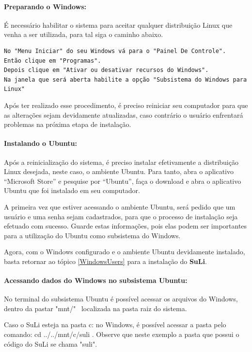 \documentclass[12pt, a4paper]{article}
\newcommand{\SL}{{\bf SuLi}}
\begin{document}
\paragraph{Preparando o Windows:} É necessário habilitar o sistema para aceitar qualquer distribuição Linux que venha a ser utilizada, para tal siga o caminho abaixo.

\begin{verbatim}
No "Menu Iniciar" do seu Windows vá para o "Painel De Controle".
Então clique em "Programas".
Depois clique em "Ativar ou desativar recursos do Windows".
Na janela que será aberta habilite a opção "Subsistema do Windows para Linux"
\end{verbatim}
Após ter realizado esse procedimento, é preciso reiniciar seu computador para que as alterações sejam devidamente atualizadas, caso contrário o usuário enfrentará problemas na próxima etapa de instalação.



\paragraph{Instalando o Ubuntu:} Após a reinicialização do sistema, é preciso instalar efetivamente a distribuição Linux desejada, neste caso, o ambiente Ubuntu. Para tanto, abra o aplicativo ``Microsoft Store'' e pesquise por ``Ubuntu'', faça o download e abra o aplicativo Ubuntu que foi instalado em seu computador.

A primeira vez que estiver acessando o ambiente Ubuntu, será pedido que um usuário e uma senha sejam cadastrados, para que o processo de instalação seja efetuado com sucesso. Guarde estas informações, pois elas podem ser importantes para a utilização do Ubuntu como subsistema do Windows.

Agora, com o Windows configurado e o ambiente Ubuntu devidamente instalado, basta retornar ao tópico \ref{WindowsUsers} para a instalação do \SL. 

\paragraph{Acessando dados do Windows no subsistema Ubuntu:} No terminal  do subsistema Ubuntu é possível acessar os arquivos do Windows, dentro da pastar "mnt/"~ localizada na pasta raiz do sistema.

Caso o SuLi esteja na pasta c: no Windows, é possível acessar a pasta pelo comando: cd ../../mnt/c/suli . Observe que neste exemplo a pasta que possui o código do SuLi se chama "suli".
\end{document}

